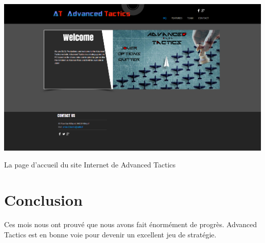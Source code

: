 \documentclass{article}
\begin{document}
\begin{center}
\includegraphics[scale=1]{site}
\par
La page d'accueil du site Internet de Advanced Tactics
\newline
\end{center}

\newpage

\section{Conclusion}
\par
Ces mois nous ont prouvé que nous avons fait énormément de progrès. Advanced Tactics est en bonne voie pour devenir un excellent jeu de stratégie.
\end{document}
